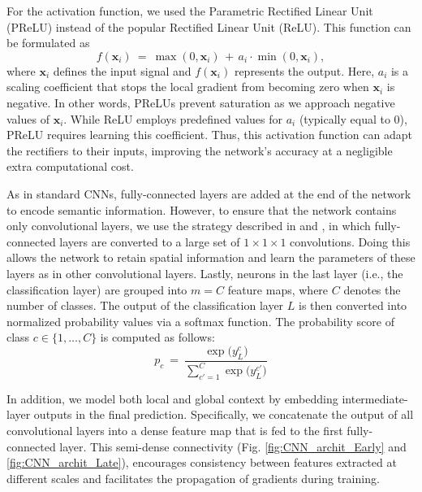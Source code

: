 \documentclass[twoside,espcrc2]{elsarticle}
\newcommand{\vold}[1]{$#1\!\times\!#1\!\times\!#1$}
\renewcommand{\vec}[1]{\mathbf{#1}}
\newcommand{\xx}{\vec x}
\begin{document}
For the activation function, we used the Parametric Rectified Linear Unit (PReLU) \cite{he2015delving} instead of the popular Rectified Linear Unit (ReLU). This function can be formulated as
\begin{equation}
    f(\xx_i) \ = \ \max(0, \xx_i) \, + \, a_i \! \cdot \! \min(0,\xx_i),
\end{equation}
where $\xx_i$ defines the input signal and $f(\xx_i)$ represents the output. Here, $a_i$ is a scaling coefficient that stops the local gradient from becoming zero when $\xx_i$ is negative. In other words, PReLUs prevent saturation as we approach negative values of $\xx_i$. While ReLU employs predefined values for $a_i$ (typically equal to 0), PReLU requires learning this coefficient. Thus, this activation function can adapt the rectifiers to their inputs, improving the network's accuracy at a negligible extra computational cost. 

As in standard CNNs, fully-connected layers are added at the end of the network to encode semantic information. However, to ensure that the network contains only convolutional layers, we use the strategy described in \cite{long2015fully} and \cite{kamnitsas2017efficient}, in which fully-connected layers are converted to a large set of \vold{1} convolutions. Doing this allows the network to retain spatial information and learn the parameters of these layers as in other convolutional layers. Lastly, neurons in the last layer (i.e., the classification layer) are grouped into $m=C$ feature maps, where $C$ denotes the number of classes. The output of the classification layer $L$ is then converted into normalized probability values via a softmax function. The probability score of class $c \in \{1, \ldots, C\}$ is computed as follows:
\begin{equation}
        p_c \ = \ \frac{\exp\big(y^c_L\big)}{\sum^{C}_{c'=1} \exp\big(y^{c'}_L\big)}
\label{eq:SoftMax}
\end{equation}
 
In addition, we model both local and global context by embedding intermediate-layer outputs in the final prediction. Specifically, we concatenate the output of all convolutional layers into a dense feature map that is fed to the first fully-connected layer. This semi-dense connectivity (Fig. \ref{fig:CNN_archit_Early} and \ref{fig:CNN_archit_Late}), encourages consistency between features extracted at different scales and facilitates the propagation of gradients during training. 

\end{document}
